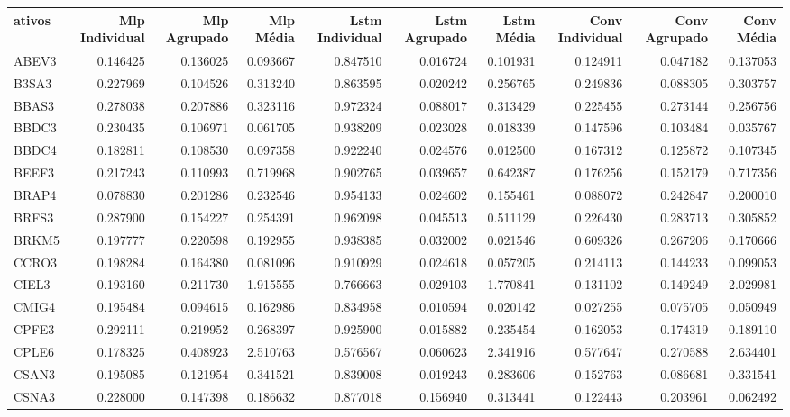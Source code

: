 \begin{tabular}{lrrrrrrrrr}
\toprule
ativos & Mlp Individual & Mlp Agrupado & Mlp Média & Lstm Individual & Lstm Agrupado & Lstm Média & Conv Individual & Conv Agrupado & Conv Média \\
\midrule
ABEV3 & 0.146425 & 0.136025 & 0.093667 & 0.847510 & 0.016724 & 0.101931 & 0.124911 & 0.047182 & 0.137053 \\
B3SA3 & 0.227969 & 0.104526 & 0.313240 & 0.863595 & 0.020242 & 0.256765 & 0.249836 & 0.088305 & 0.303757 \\
BBAS3 & 0.278038 & 0.207886 & 0.323116 & 0.972324 & 0.088017 & 0.313429 & 0.225455 & 0.273144 & 0.256756 \\
BBDC3 & 0.230435 & 0.106971 & 0.061705 & 0.938209 & 0.023028 & 0.018339 & 0.147596 & 0.103484 & 0.035767 \\
BBDC4 & 0.182811 & 0.108530 & 0.097358 & 0.922240 & 0.024576 & 0.012500 & 0.167312 & 0.125872 & 0.107345 \\
BEEF3 & 0.217243 & 0.110993 & 0.719968 & 0.902765 & 0.039657 & 0.642387 & 0.176256 & 0.152179 & 0.717356 \\
BRAP4 & 0.078830 & 0.201286 & 0.232546 & 0.954133 & 0.024602 & 0.155461 & 0.088072 & 0.242847 & 0.200010 \\
BRFS3 & 0.287900 & 0.154227 & 0.254391 & 0.962098 & 0.045513 & 0.511129 & 0.226430 & 0.283713 & 0.305852 \\
BRKM5 & 0.197777 & 0.220598 & 0.192955 & 0.938385 & 0.032002 & 0.021546 & 0.609326 & 0.267206 & 0.170666 \\
CCRO3 & 0.198284 & 0.164380 & 0.081096 & 0.910929 & 0.024618 & 0.057205 & 0.214113 & 0.144233 & 0.099053 \\
CIEL3 & 0.193160 & 0.211730 & 1.915555 & 0.766663 & 0.029103 & 1.770841 & 0.131102 & 0.149249 & 2.029981 \\
CMIG4 & 0.195484 & 0.094615 & 0.162986 & 0.834958 & 0.010594 & 0.020142 & 0.027255 & 0.075705 & 0.050949 \\
CPFE3 & 0.292111 & 0.219952 & 0.268397 & 0.925900 & 0.015882 & 0.235454 & 0.162053 & 0.174319 & 0.189110 \\
CPLE6 & 0.178325 & 0.408923 & 2.510763 & 0.576567 & 0.060623 & 2.341916 & 0.577647 & 0.270588 & 2.634401 \\
CSAN3 & 0.195085 & 0.121954 & 0.341521 & 0.839008 & 0.019243 & 0.283606 & 0.152763 & 0.086681 & 0.331541 \\
CSNA3 & 0.228000 & 0.147398 & 0.186632 & 0.877018 & 0.156940 & 0.313441 & 0.122443 & 0.203961 & 0.062492 \\

\end{tabular}
